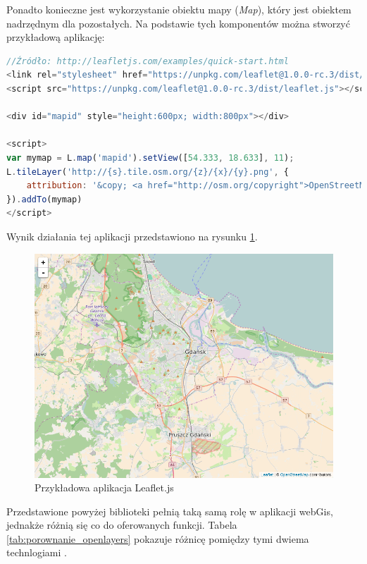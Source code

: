 Ponadto konieczne jest wykorzystanie obiektu mapy (\textit{Map}), który jest obiektem nadrzędnym dla pozostałych.
Na podstawie tych komponentów można stworzyć przykładową aplikację:
\begin{lstlisting}[frame=L, language=JavaScript, caption={bla bla}]
//Źródło: http://leafletjs.com/examples/quick-start.html
<link rel="stylesheet" href="https://unpkg.com/leaflet@1.0.0-rc.3/dist/leaflet.css" />
<script src="https://unpkg.com/leaflet@1.0.0-rc.3/dist/leaflet.js"></script>
 
<div id="mapid" style="height:600px; width:800px"></div>

<script>
var mymap = L.map('mapid').setView([54.333, 18.633], 11);
L.tileLayer('http://{s}.tile.osm.org/{z}/{x}/{y}.png', {
    attribution: '&copy; <a href="http://osm.org/copyright">OpenStreetMap</a> contributors'
}).addTo(mymap)
</script>
\end{lstlisting}

Wynik działania tej aplikacji przedstawiono na rysunku \ref{fig:leaflet_example}.

\begin{figure}[h!]
    \centering
    \includegraphics[width=1.0\textwidth]{img/leaflet_example.png}
    \caption{Przykładowa aplikacja Leaflet.js}
    \label{fig:leaflet_example}
\end{figure}

Przedstawione powyżej biblioteki pełnią taką samą rolę w aplikacji webGis, jednakże różnią się co do oferowanych funkcji.
Tabela \ref{tab:porownanie_openlayers} pokazuje różnicę pomiędzy tymi dwiema technlogiami \cite{website:OpenLayersVSLeaflet}.

